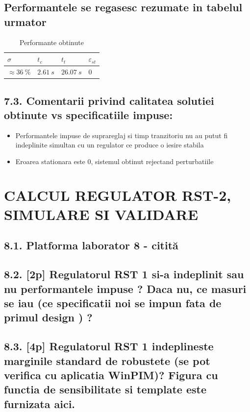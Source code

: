 \documentclass[12pt,english]{article}
\begin{document}
\subsection {Performantele se regasesc rezumate in tabelul urmator }
\begin{table}[H]
  \centering
    \begin{tabular}{|l|l|l|l|}
      \hline
       $\sigma$ & $t_c$ & $t_t$ & $\varepsilon_{st}$ \\
      \hline
       $\approx36\ \%$ & $ 2.61\ s$ & $ 26.07\ s$ & $0$ \\
      \hline
    \end{tabular}
    \caption{Performante obtinute}
\end{table}

\subsection {7.3. Comentarii privind calitatea solutiei obtinute vs specificatiile impuse: }
\begin{itemize}
  \item Performantele impuse de suprareglaj si timp tranzitoriu nu au putut fi indeplinite simultan cu un regulator ce produce o iesire stabila
  \item Eroarea stationara este 0, sistemul obtinut rejectand perturbatiile
\end{itemize}

\section {CALCUL REGULATOR RST-2, SIMULARE SI VALIDARE }
\subsection {8.1. Platforma laborator 8 - citită }
\subsection {8.2. [2p] Regulatorul RST 1 si-a indeplinit sau nu performantele impuse ?  Daca nu, ce masuri se iau (ce specificatii noi se impun fata de primul design ) ? }
\subsection {8.3. [4p] Regulatorul RST 1 indeplineste marginile standard de robustete (se pot verifica cu aplicatia WinPIM)?   Figura cu functia de sensibilitate si template este furnizata aici. }
\end{document}
